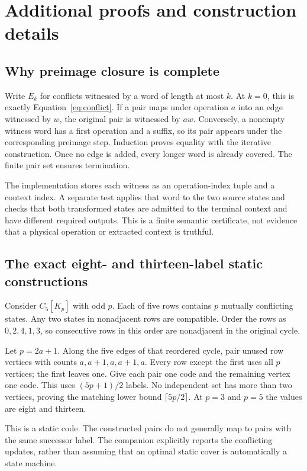\documentclass[11pt,letterpaper]{article}
\theoremstyle{remark}\newtheorem{remark}{Remark}[section]
\begin{document}
\par\bigskip
\appendix
\section{Additional proofs and construction details}
\label{app:proof}
\subsection{Why preimage closure is complete}
Write $E_k$ for conflicts witnessed by a word of length at most $k$. At $k=0$, this is exactly Equation~\eqref{eq:conflict}. If a pair maps under operation $a$ into an edge witnessed by $w$, the original pair is witnessed by $aw$. Conversely, a nonempty witness word has a first operation and a suffix, so its pair appears under the corresponding preimage step. Induction proves equality with the iterative construction. Once no edge is added, every longer word is already covered. The finite pair set ensures termination.

The implementation stores each witness as an operation-index tuple and a context index. A separate test applies that word to the two source states and checks that both transformed states are admitted to the terminal context and have different required outputs. This is a finite semantic certificate, not evidence that a physical operation or extracted context is truthful.

\subsection{The exact eight- and thirteen-label static constructions}
Consider $C_5[K_p]$ with odd $p$. Each of five rows contains $p$ mutually conflicting states. Any two states in nonadjacent rows are compatible. Order the rows as $0,2,4,1,3$, so consecutive rows in this order are nonadjacent in the original cycle.

Let $p=2a+1$. Along the five edges of that reordered cycle, pair unused row vertices with counts $a,a+1,a,a+1,a$. Every row except the first uses all $p$ vertices; the first leaves one. Give each pair one code and the remaining vertex one code. This uses $(5p+1)/2$ labels. No independent set has more than two vertices, proving the matching lower bound $\lceil5p/2\rceil$. At $p=3$ and $p=5$ the values are eight and thirteen.

This is a static code. The constructed pairs do not generally map to pairs with the same successor label. The companion explicitly reports the conflicting updates, rather than assuming that an optimal static cover is automatically a state machine.
\end{document}
